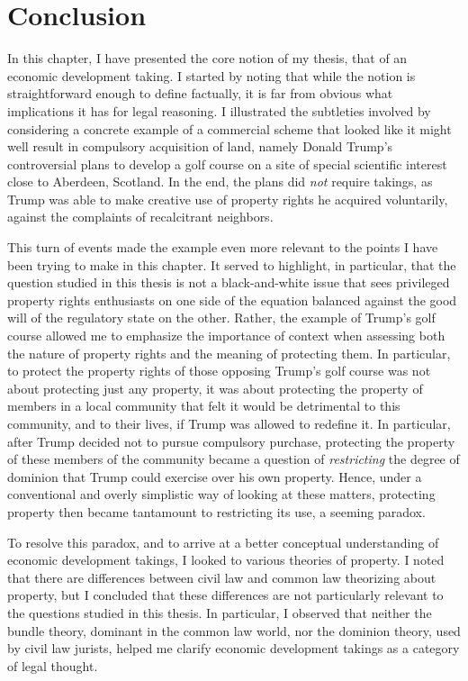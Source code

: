 \documentclass[12pt,a4paper]{book} %
\begin{document}
\section{Conclusion}

In this chapter, I have presented the core notion of my thesis, that of an economic development taking. I started by noting that while the notion is straightforward enough to define factually, it is far from obvious what implications it has for legal reasoning. I illustrated the subtleties involved by considering a concrete example of a commercial scheme that looked like it might well result in compulsory acquisition of land, namely Donald Trump's controversial plans to develop a golf course on a site of special scientific interest close to Aberdeen, Scotland. In the end, the plans did {\it not} require takings, as Trump was able to make creative use of property rights he acquired voluntarily, against the complaints of recalcitrant neighbors.

This turn of events made the example even more relevant to the points I have been trying to make in this chapter. It served to highlight, in particular, that the question studied in this thesis is not a black-and-white issue that sees privileged property rights enthusiasts on one side of the equation balanced against the good will of the regulatory state on the other. Rather, the example of Trump's golf course allowed me to emphasize the importance of context when assessing both the nature of property rights and the meaning of protecting them. In particular, to protect the property rights of those opposing Trump's golf course was not about protecting just any property, it was about protecting the property of members in a local community that felt it would be detrimental to this community, and to their lives, if Trump was allowed to redefine it. In particular, after Trump decided not to pursue compulsory purchase, protecting the property of these members of the community became a question of {\it restricting} the degree of dominion that Trump could exercise over his own property. Hence, under a conventional and overly simplistic way of looking at these matters, protecting property then became tantamount to restricting its use, a seeming paradox.

To resolve this paradox, and to arrive at a better conceptual understanding of economic development takings, I looked to various theories of property. I noted that there are differences between civil law and common law theorizing about property, but I concluded that these differences are not particularly relevant to the questions studied in this thesis. In particular, I observed that neither the bundle theory, dominant in the common law world, nor the dominion theory, used by civil law jurists, helped me clarify economic development takings as a category of legal thought.
\end{document}
